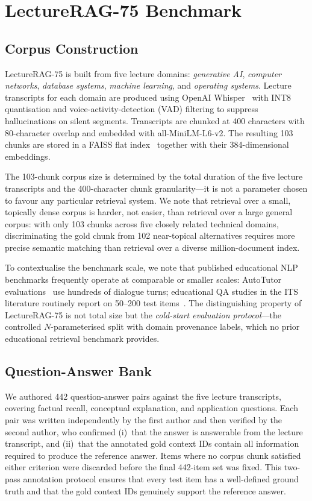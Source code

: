 \documentclass[journal]{IEEEtran}
\begin{document}
\section{LectureRAG-75 Benchmark}
\label{sec:benchmark}

\subsection{Corpus Construction}
LectureRAG-75 is built from five lecture domains: \emph{generative AI},
\emph{computer networks}, \emph{database systems}, \emph{machine learning},
and \emph{operating systems}.  Lecture transcripts for each domain are
produced using OpenAI Whisper~\cite{radford2023whisper} with INT8
quantisation and voice-activity-detection (VAD) filtering to suppress
hallucinations on silent segments.  Transcripts are chunked at 400
characters with 80-character overlap and embedded with all-MiniLM-L6-v2.
The resulting 103 chunks are stored in a FAISS flat
index~\cite{johnson2021faiss} together with their 384-dimensional
embeddings.

The 103-chunk corpus size is determined by the total duration of the five
lecture transcripts and the 400-character chunk granularity---it is not a
parameter chosen to favour any particular retrieval system.  We note that
retrieval over a small, topically dense corpus is harder, not easier, than
retrieval over a large general corpus: with only 103 chunks across five
closely related technical domains, discriminating the gold chunk from 102
near-topical alternatives requires more precise semantic matching than
retrieval over a diverse million-document index.

To contextualise the benchmark scale, we note that published educational
NLP benchmarks frequently operate at comparable or smaller scales: AutoTutor
evaluations~\cite{graesser2004autotutor} use hundreds of dialogue turns;
educational QA studies in the ITS literature routinely report on 50--200
test items~\cite{kurdi2020systematic}.  The distinguishing property of
LectureRAG-75 is not total size but the \emph{cold-start evaluation
protocol}---the controlled $N$-parameterised split with domain provenance
labels, which no prior educational retrieval benchmark provides.

\subsection{Question-Answer Bank}
We authored 442 question-answer pairs against the five lecture transcripts,
covering factual recall, conceptual explanation, and application questions.
Each pair was written independently by the first author and then verified
by the second author, who confirmed (i)~that the answer is answerable from
the lecture transcript, and (ii)~that the annotated gold context IDs
contain all information required to produce the reference answer.  Items
where no corpus chunk satisfied either criterion were discarded before the
final 442-item set was fixed.  This two-pass annotation protocol ensures
that every test item has a well-defined ground truth and that the gold
context IDs genuinely support the reference answer.
\end{document}
